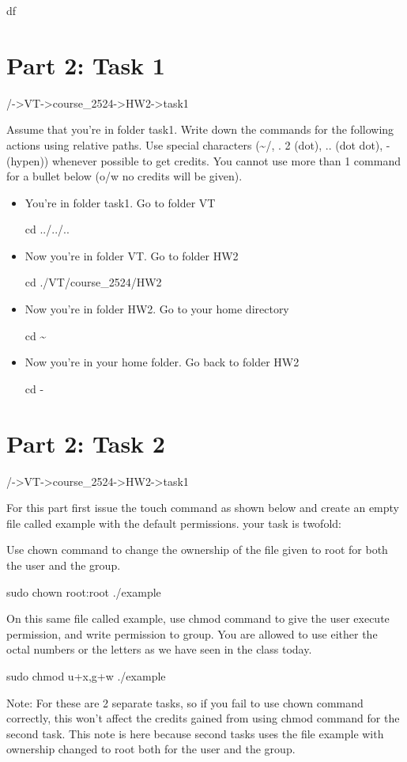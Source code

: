 \documentclass[12pt,letterpaper,titlepage]{article}
\begin{document}
\begin{raggedright}
df

\clearpage
\section*{Part 2: Task 1}

/->VT->course\_2524->HW2->task1

Assume that you’re in folder task1. Write down the commands for the following actions using relative paths. Use special characters (\textasciitilde/, . 2 (dot), .. (dot dot), - (hypen)) whenever possible to get credits. You cannot use more than 1 command for a bullet below (o/w no credits will be given).
\begin{itemize}
\item You’re in folder task1. Go to folder VT

cd ../../..

\item Now you’re in folder VT. Go to folder HW2 

cd ./VT/course\_2524/HW2

\item Now you’re in folder HW2. Go to your home directory 

cd \textasciitilde

\item Now you’re in your home folder. Go back to folder HW2

cd -
\end{itemize} 

\clearpage
\section*{Part 2: Task 2}

/->VT->course\_2524->HW2->task1

For this part first issue the touch command as shown below and create an empty file called example with the default permissions. your task is twofold: 

Use chown command to change the ownership of the file given to root for both the user and the group. 

sudo chown root:root ./example

On this same file called example, use chmod command to give the user execute permission, and write permission to group. You are allowed to use either the octal numbers or the letters as we have seen in the class today. 

sudo chmod u+x,g+w ./example

Note: For these are 2 separate tasks, so if you fail to use chown command correctly, this won’t affect the credits gained from using chmod command for the second task. This note is here because second tasks uses the file example with ownership changed to root both for the user and the group.

\end{raggedright}
\end{document}
